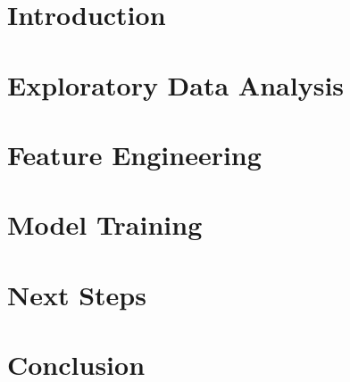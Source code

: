 






 

\begin{titlepage}


\end{titlepage}


\setcounter{savepage}{\value{page}}


\section{Introduction}


\section{Exploratory Data Analysis}


\section{Feature Engineering}


\section{Model Training}


\section{Next Steps}


\section{Conclusion}


\singlespacing
\clearpage
\appendix
{}
\setcounter{page}{\numexpr\value{savepage}}






